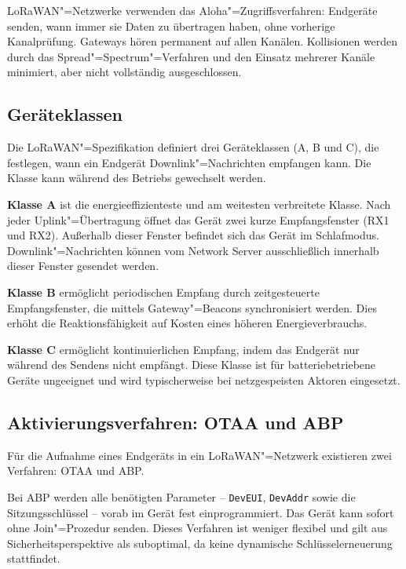 LoRaWAN"=Netzwerke verwenden das Aloha"=Zugriffsverfahren: Endgeräte senden, wann
immer sie Daten zu übertragen haben, ohne vorherige Kanalprüfung. Gateways hören
permanent auf allen Kanälen. Kollisionen werden durch das Spread"=Spectrum"=Verfahren
und den Einsatz mehrerer Kanäle minimiert, aber nicht vollständig ausgeschlossen.

\subsection{Geräteklassen}
\label{subsec:geraeteklassen}

Die LoRaWAN"=Spezifikation definiert drei Geräteklassen (A, B und C), die festlegen,
wann ein Endgerät Downlink"=Nachrichten empfangen kann. Die Klasse kann während des
Betriebs gewechselt werden.

\textbf{Klasse A} ist die energieeffizienteste und am weitesten verbreitete Klasse.
Nach jeder Uplink"=Übertragung öffnet das Gerät zwei kurze Empfangsfenster
(RX1 und RX2). Außerhalb dieser Fenster befindet sich das Gerät im Schlafmodus.
Downlink"=Nachrichten können vom Network Server ausschließlich innerhalb dieser
Fenster gesendet werden.

\textbf{Klasse B} ermöglicht periodischen Empfang durch zeitgesteuerte Empfangsfenster,
die mittels Gateway"=Beacons synchronisiert werden. Dies erhöht die Reaktionsfähigkeit
auf Kosten eines höheren Energieverbrauchs.

\textbf{Klasse C} ermöglicht kontinuierlichen Empfang, indem das Endgerät nur während
des Sendens nicht empfängt. Diese Klasse ist für batteriebetriebene Geräte ungeeignet
und wird typischerweise bei netzgespeisten Aktoren eingesetzt.

\subsection{Aktivierungsverfahren: OTAA und ABP}
\label{subsec:aktivierung}

Für die Aufnahme eines Endgeräts in ein LoRaWAN"=Netzwerk existieren zwei Verfahren:
\ac{OTAA} und \ac{ABP}.

Bei \ac{ABP} werden alle benötigten Parameter -- \texttt{DevEUI}, \texttt{DevAddr}
sowie die Sitzungsschlüssel -- vorab im Gerät fest einprogrammiert. Das Gerät kann
sofort ohne Join"=Prozedur senden. Dieses Verfahren ist weniger flexibel und gilt aus
Sicherheitsperspektive als suboptimal, da keine dynamische Schlüsselerneuerung
stattfindet.

